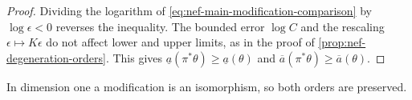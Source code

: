 \begin{proof}
Dividing the logarithm of \eqref{eq:nef-main-modification-comparison} by $\log\epsilon<0$ reverses the inequality. The bounded error $\log C$ and the rescaling $\epsilon\mapsto K\epsilon$ do not affect lower and upper limits, as in the proof of \cref{prop:nef-degeneration-orders}. This gives $\underline a(\pi^*\theta)\geq\underline a(\theta)$ and $\overline a(\pi^*\theta)\geq\overline a(\theta)$.
\end{proof}

In dimension one a modification is an isomorphism, so both orders are preserved.
